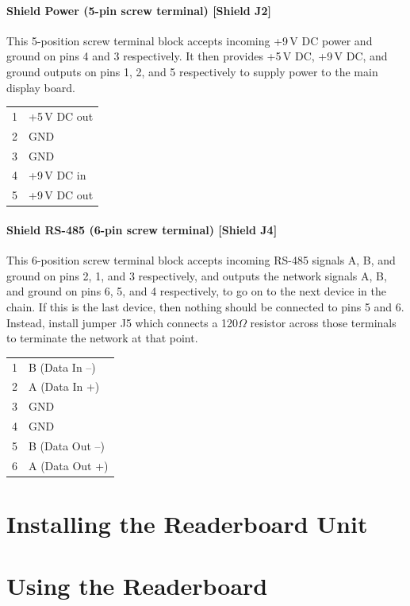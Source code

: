 {\subsubsection{Shield Power (5-pin screw terminal) [Shield J2]}
This 5-position screw terminal block accepts incoming +9\,V DC power and ground on pins 4 and 3 respectively. It then provides
+5\,V DC, +9\,V DC, and ground outputs on pins 1, 2, and 5 respectively to supply power to the main display board.
\begin{center}
	\begin{tabular}{rl}
		1&+5\,V DC out\\
		2&GND\\
		3&GND\\
		4&+9\,V DC in\\
		5&+9\,V DC out\\
	\end{tabular}
\end{center}

\subsubsection{Shield RS-485 (6-pin screw terminal) [Shield J4]}
This 6-position screw terminal block accepts incoming RS-485 signals A, B, and ground on pins 2, 1, and 3 respectively, and outputs
the network signals A, B, and ground on pins 6, 5, and 4 respectively, to go on to the next device in the chain. If this is the last
device, then nothing should be connected to pins 5 and 6. Instead, install jumper J5 which connects a 120$\Omega$ resistor across
those terminals to terminate the network at that point.
\begin{center}
	\begin{tabular}{rl}
		1&B (Data In --)\\
		2&A (Data In +)\\
		3&GND\\
		4&GND\\
		5&B (Data Out --)\\
		6&A (Data Out +)\\
	\end{tabular}
\end{center}
}

\chapter{Installing the Readerboard Unit}
\chapter{Using the Readerboard}
